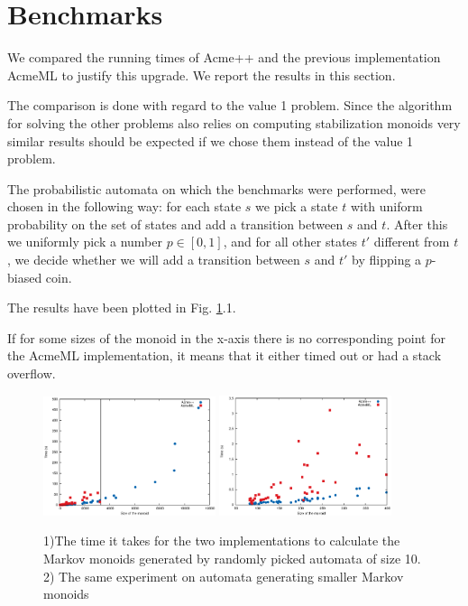 \section{Benchmarks}
We compared the running times of Acme++ and the previous
implementation AcmeML to justify this upgrade. We report the results
in this section.

The comparison is done with regard to the value 1 problem. Since the algorithm
for solving the other problems also relies on computing stabilization monoids
very similar results should be expected if we chose them instead of the value 1
problem.

The probabilistic automata on which the benchmarks were performed, were chosen
in the following way: for each state $s$ we pick a state $t$ with uniform
probability on the set of states and add a transition between $s$ and $t$. After
this we uniformly pick a number $p\in[0,1]$, and for all other states $t'$
different from $t$, we decide whether we will add a transition between $s$ and
$t'$ by flipping a $p$-biased coin.

The results have been plotted in Fig. \ref{bench1}.1. 

If for some sizes of the monoid in the x-axis there is no
corresponding point for the AcmeML implementation, it means that it
either timed out or had a stack overflow.

\begin{figure}[h!]
  \begin{center}
    \includegraphics[width=0.45\textwidth]{graph/lines}
    \includegraphics[width=0.45\textwidth]{graph/zoomlines}
    \caption{1)The time it takes for the two implementations to
      calculate the Markov monoids generated by randomly picked
      automata of size 10. 2) The same experiment on automata
      generating smaller Markov monoids}
      \label{bench1}
  \end{center}  
\end{figure}

